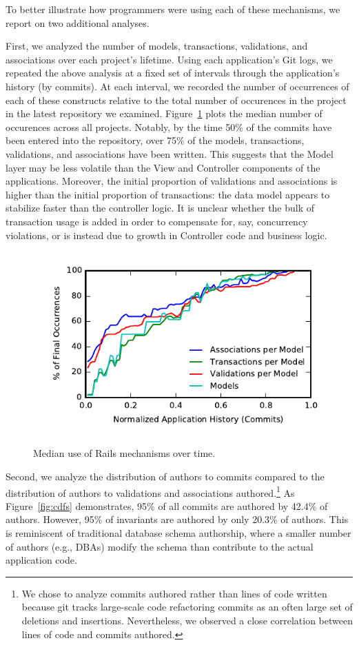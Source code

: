  To better illustrate how programmers
were using each of these mechanisms, we report on two additional
analyses.

First, we analyzed the number of models, transactions, validations,
and associations over each project's lifetime. Using each
application's Git logs, we repeated the above analysis at a fixed set
of intervals through the application's history (by commits). At each
interval, we recorded the number of occurrences of each of these
constructs relative to the total number of occurences in the project
in the latest repository we examined. Figure~\ref{fig:historical}
plots the median number of occurences across all projects. Notably, by
the time 50\% of the commits have been entered into the repository,
over 75\% of the models, transactions, validations, and associations
have been written. This suggests that the Model layer may be less
volatile than the View and Controller components of the
applications. Moreover, the initial proportion of validations and
associations is higher than the initial proportion of transactions:
the data model appears to stabilize faster than the controller
logic. It is unclear whether the bulk of transaction usage is added in
order to compensate for, say, concurrency violations, or is instead
due to growth in Controller code and business logic.

\begin{figure}
\includegraphics[width=\columnwidth]{figs/historical-median.pdf}\vspace{-2em}
\caption{Median use of Rails mechanisms over time.}
\label{fig:historical}
\end{figure}

Second, we analyze the distribution of authors to commits compared to
the distribution of authors to validations and associations
authored.\footnote{We chose to analyze commits authored rather than
  lines of code written because git tracks large-scale code
  refactoring commits as an often large set of deletions and
  insertions. Nevertheless, we observed a close correlation between
  lines of code and commits authored.} As Figure~\ref{fig:cdfs}
demonstrates, 95\% of all commits are authored by 42.4\% of
authors. However, 95\% of invariants are authored by only 20.3\% of
authors. This is reminiscent of traditional database schema
authorship, where a smaller number of authors (e.g., DBAs) modify the
schema than contribute to the actual application code.

